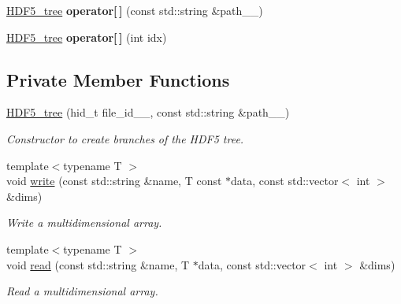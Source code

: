 \begin{DoxyCompactItemize}
\item 
\hypertarget{classsirius_1_1_h_d_f5__tree_a0450b3380b4ebbd050317c02f0ce55a8}{}\hyperlink{classsirius_1_1_h_d_f5__tree}{H\+D\+F5\+\_\+tree} {\bfseries operator\mbox{[}$\,$\mbox{]}} (const std\+::string \&path\+\_\+\+\_\+)\label{classsirius_1_1_h_d_f5__tree_a0450b3380b4ebbd050317c02f0ce55a8}

\item 
\hypertarget{classsirius_1_1_h_d_f5__tree_a3493cebd356be28ad3a869e6f6f4f24c}{}\hyperlink{classsirius_1_1_h_d_f5__tree}{H\+D\+F5\+\_\+tree} {\bfseries operator\mbox{[}$\,$\mbox{]}} (int idx)\label{classsirius_1_1_h_d_f5__tree_a3493cebd356be28ad3a869e6f6f4f24c}

\end{DoxyCompactItemize}
\subsection*{Private Member Functions}
\begin{DoxyCompactItemize}
\item 
\hyperlink{classsirius_1_1_h_d_f5__tree_a76a0c9dbffbdf53654a72226c492343c}{H\+D\+F5\+\_\+tree} (hid\+\_\+t file\+\_\+id\+\_\+\+\_\+, const std\+::string \&path\+\_\+\+\_\+)
\begin{DoxyCompactList}\small\item\em Constructor to create branches of the H\+D\+F5 tree. \end{DoxyCompactList}\item 
{\footnotesize template$<$typename T $>$ }\\void \hyperlink{classsirius_1_1_h_d_f5__tree_ad33f8d8e971984bb6dabc4dfcbb96b95}{write} (const std\+::string \&name, T const $\ast$data, const std\+::vector$<$ int $>$ \&dims)
\begin{DoxyCompactList}\small\item\em Write a multidimensional array. \end{DoxyCompactList}\item 
{\footnotesize template$<$typename T $>$ }\\void \hyperlink{classsirius_1_1_h_d_f5__tree_a73acd56513b0250368704ac405ae70eb}{read} (const std\+::string \&name, T $\ast$data, const std\+::vector$<$ int $>$ \&dims)
\begin{DoxyCompactList}\small\item\em Read a multidimensional array. \end{DoxyCompactList}\end{DoxyCompactItemize}
